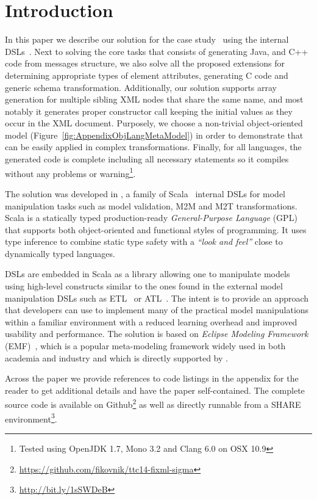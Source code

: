 

\section{Introduction}
\label{sec:Introduction}

In this paper we describe our solution for the \TTC \FIXML case study~\cite{Lano2014} using the \SIGMA internal DSLs~\cite{Krikava2014}.
Next to solving the core tasks that consists of generating Java, \Csharp and C++ code from \FIXML messages structure, we also solve all the proposed extensions for determining appropriate types of element attributes, generating C code and generic \FIXML schema transformation.
Additionally, our solution supports array generation for multiple sibling XML nodes that share the same name, and most notably it generates proper constructor call keeping the initial values as they occur in the XML document.
Purposely, we choose a non-trivial object-oriented model (\Cf Figure~\ref{fig:AppendixObjLangMetaModel}) in order to demonstrate that \SIGMA can be easily applied in complex transformations.
Finally, for all languages, the generated code is complete including all necessary statements so it compiles without any problems or warning\footnote{Tested using OpenJDK 1.7, Mono 3.2 and Clang 6.0 on OSX 10.9}.

The solution was developed in \SIGMA, a family of Scala~\cite{Odersky2004} internal DSLs for model manipulation tasks such as model validation, M2M and M2T transformations.
Scala is a statically typed production-ready \emph{General-Purpose Language} (GPL) that supports both object-oriented and functional styles of programming.
It uses type inference to combine static type safety with a \emph{``look and feel''} close to dynamically typed languages.

\SIGMA DSLs are embedded in Scala as a library allowing one to manipulate models using high-level constructs similar to the ones found in the external model manipulation DSLs such as ETL~\cite{Kolovos2008a} or ATL~\cite{Jouault2006}.
The intent is to provide an approach that developers can use to implement many of the practical model manipulations within a familiar environment with a reduced learning overhead and improved usability and performance.
The solution is based on \emph{Eclipse Modeling Framework} (EMF)~\cite{EMF}, which is a popular meta-modeling framework widely used in both academia and industry and which is directly supported by \SIGMA.

Across the paper we provide references to code listings in the appendix for the reader to get additional details and have the paper self-contained.
The complete source code is available on Github\footnote{\url{https://github.com/fikovnik/ttc14-fixml-sigma}} as well as directly runnable from a SHARE environment\footnote{\url{http://bit.ly/1sSWDeB}}.